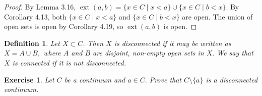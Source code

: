 \documentclass{amsart}
\newtheorem{definition}[theorem]{Definition}
\newtheorem{exercise}[theorem]{Exercise}
\newcommand{\1}{\mathds{1}}
\DeclareMathOperator{\ext}{ext}
\numberwithin{equation}{section}
\numberwithin{theorem}{section}
\begin{document}
\begin{proof}
	By Lemma 3.16, $\ext{(a,b)}=\{x\in C\mid x<a\}\cup\{x\in C\mid b<x\}$. By Corollary 4.13, both $\{x\in C\mid x<a\}\text{ and }\{x\in C\mid b<x\}$ are open. The union of open sets is open by Corollary 4.19, so $\ext{(a,b)}$ is open. 
\end{proof}

%
%
%
%
%
%
%
%
%


\begin{definition}
Let $X\subset C$. Then $X$ is {\it disconnected} if it may be written as $X=A\cup B,$ where $A$ and $B$ are disjoint, non-empty open sets in $X.$  We say that $X$ is {\it connected} if it is not disconnected.
\end{definition} 


\begin{exercise} Let $C$ be a continuum and $a\in C.$ Prove that $C\setminus\{a\}$ is a disconnected continuum.
\end{exercise} 
\end{document}
